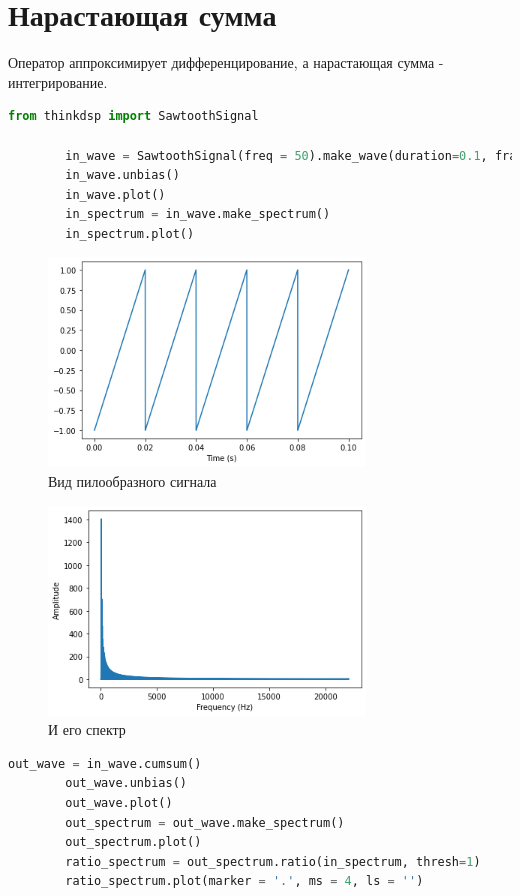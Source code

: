 \documentclass[a4paper, 12pt]{report}
\begin{document}
	\chapter{Нарастающая сумма}
	Оператор  аппроксимирует дифференцирование, а нарастающая сумма - интегрирование.
	\begin{lstlisting}[language=Python,caption=Наш любимый пилообразный сигнал]
		from thinkdsp import SawtoothSignal

		in_wave = SawtoothSignal(freq = 50).make_wave(duration=0.1, framerate=44100)
		in_wave.unbias()
		in_wave.plot()
		in_spectrum = in_wave.make_spectrum()
		in_spectrum.plot()
	\end{lstlisting}
	\begin{figure}[H]
		\centering
		\includegraphics[width=0.75\textwidth]{sum1.png}
		\caption{Вид пилообразного сигнала}
		\label{fig:sum1}
	\end{figure}
	\begin{figure}[H]
		\centering
		\includegraphics[width=0.75\textwidth]{sum2.png}
		\caption{И его спектр}
		\label{fig:sum2}
	\end{figure}
	\begin{lstlisting}[language=Python,caption=Посчитаем сумму]
		out_wave = in_wave.cumsum()
		out_wave.unbias()
		out_wave.plot()
		out_spectrum = out_wave.make_spectrum()
		out_spectrum.plot()
		ratio_spectrum = out_spectrum.ratio(in_spectrum, thresh=1)
		ratio_spectrum.plot(marker = '.', ms = 4, ls = '')
	\end{lstlisting}
\end{document}
